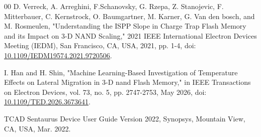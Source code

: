 \documentclass[journal,twoside,web]{ieeecolor}
\begin{document}
\begin{thebibliography}{00}
 D. Verreck, A. Arreghini, F.Schanovsky, G. Rzepa, Z. Stanojevic, F. Mitterbauer, C. Kernstrock, O. Baumgartner, M. Karner, G. Van den bosch, and M. Rosmeulen, "Understanding the ISPP Slope in Charge Trap Flash Memory and its Impact on 3-D NAND Scaling," 2021 IEEE International Electron Devices Meeting (IEDM), San Francisco, CA, USA, 2021, pp. 1-4, doi: \href{https://doi.org/10.1109/IEDM19574.2021.9720506}{10.1109/IEDM19574.2021.9720506}.

 I. Han and H. Shin, "Machine Learning-Based Investigation of Temperature Effects on Lateral Migration in 3-D nand Flash Memory," in IEEE Transactions on Electron Devices, vol. 73, no. 5, pp. 2747-2753, May 2026, doi: \href{https://doi.org/10.1109/TED.2026.3673641}{10.1109/TED.2026.3673641}.

 TCAD Sentaurus Device User Guide Version 2022, Synopsys, Mountain View, CA, USA, Mar. 2022.



\end{thebibliography}
\end{document}
